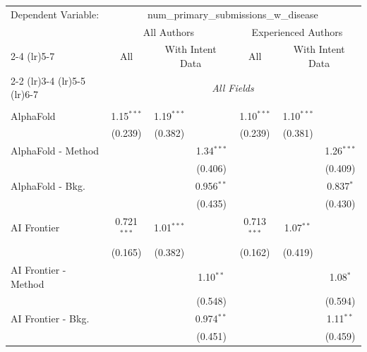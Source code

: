 \begingroup
\centering
\begin{tabular}{lcccccc}
   \tabularnewline \midrule \midrule
   Dependent Variable: & \multicolumn{6}{c}{num\_primary\_submissions\_w\_disease}\\
 & \multicolumn{3}{c}{All Authors} & \multicolumn{3}{c}{Experienced Authors} \\
\cmidrule(lr){2-4} \cmidrule(lr){5-7}
 & \multicolumn{1}{c}{All} & \multicolumn{2}{c}{With Intent Data} & \multicolumn{1}{c}{All} & \multicolumn{2}{c}{With Intent Data} \\
\cmidrule(lr){2-2} \cmidrule(lr){3-4} \cmidrule(lr){5-5} \cmidrule(lr){6-7}
 & \multicolumn{6}{c}{\textit{All Fields}} \\ \\
   AlphaFold            & 1.15$^{***}$  & 1.19$^{***}$ &              & 1.10$^{***}$  & 1.10$^{***}$ &   \\   
                        & (0.239)       & (0.382)      &              & (0.239)       & (0.381)      &   \\   
   AlphaFold - Method   &               &              & 1.34$^{***}$ &               &              & 1.26$^{***}$\\   
                        &               &              & (0.406)      &               &              & (0.409)\\   
   AlphaFold - Bkg.     &               &              & 0.956$^{**}$ &               &              & 0.837$^{*}$\\   
                        &               &              & (0.435)      &               &              & (0.430)\\   
   AI Frontier          & 0.721$^{***}$ & 1.01$^{***}$ &              & 0.713$^{***}$ & 1.07$^{**}$  &   \\   
                        & (0.165)       & (0.382)      &              & (0.162)       & (0.419)      &   \\   
   AI Frontier - Method &               &              & 1.10$^{**}$  &               &              & 1.08$^{*}$\\   
                        &               &              & (0.548)      &               &              & (0.594)\\   
   AI Frontier - Bkg.   &               &              & 0.974$^{**}$ &               &              & 1.11$^{**}$\\   
                        &               &              & (0.451)      &               &              & (0.459)\\   

\end{tabular}
